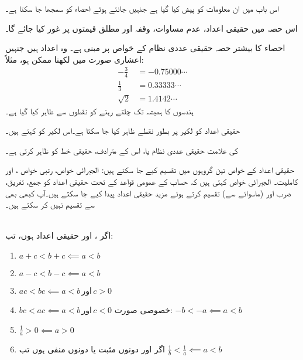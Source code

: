 اس باب میں ان معلومات کو پیش کیا گیا ہے جنہیں جانتے ہوئے احصاء کو سمجھا جا سکتا ہے۔

اس حصہ میں حقیقی اعداد، عدم مساوات، وقفہ اور مطلق قیمتوں پر غور کیا جائے گا۔

احصاء کا بیشتر حصہ حقیقی عددی نظام کے خواص پر مبنی ہے۔ وہ اعداد ہیں جنہیں اعشاری صورت میں لکھنا ممکن ہو، مثلاً:
\begin{align*}
-\frac{3}{4}&=-0.75000\cdots\\
\frac{1}{3}&=0.33333\cdots\\
\sqrt{2}&=1.4142\cdots
\end{align*}
ہندسوں کا  ہمیشہ تک چلتے رہنے کو نقطوں  سے ظاہر کیا گیا ہے۔

حقیقی اعداد کو لکیر پر بطور نقطے ظاہر کیا جا سکتا ہے۔اس لکیر کو  کہتے ہیں۔
\begin{center}
\end{center}
 کی علامت حقیقی عددی نظام یا، اس کے مترادف، حقیقی خط کو ظاہر کرتی ہے۔

حقیقی اعداد کے خواص تین گروہوں میں تقسیم کیے جا سکتے ہیں: الجبرائی خواص، رتبی خواص ، اور کاملیت۔ الجبرائی خواص کہتی ہیں کہ حساب کے عمومی قواعد کے تحت حقیقی اعداد کو جمع، تفریق، ضرب اور (ماسوائے  سے) تقسیم   کرتے ہوئے مزید حقیقی اعداد پیدا کیے جا سکتے ہیں۔آپ کبھی بھی  سے تقسیم نہیں کر سکتے ہیں۔

\\
اگر ،  اور  حقیقی اعداد ہوں، تب:
\begin{enumerate}[1.]
\item
$a+c<b+c\impliedby a<b$
\item
$a-c<b-c\impliedby a<b$
\item
$ac<bc\impliedby a<b \,\text{اور}\, c>0$
\item
$bc<ac\impliedby a<b\, \text{اور}\, c<0$\quad 
خصوصی صورت:
$-b<-a\impliedby a<b$
\item
$\frac{1}{a}>0\impliedby a>0$
\item
اگر  اور  دونوں مثبت یا دونوں منفی ہوں تب 
$\frac{1}{b}<\frac{1}{a}\impliedby a<b$
\end{enumerate}

